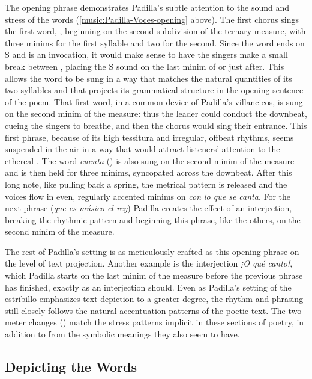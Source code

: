 The opening phrase demonstrates Padilla's subtle attention to the sound and
stress of the words (\cref{music:Padilla-Voces-opening} above).
The first chorus sings the first word, , beginning on the second
subdivision of the ternary measure, with three minims for the first syllable and
two for the second.
Since the word ends on S and is an invocation, it would make sense to have the
singers make a small break between , placing the S sound on the
last minim of  or just after.
This allows the word to be sung in a way that matches the natural quantities of
its two syllables and that projects its grammatical structure in the opening
sentence of the poem.
That first word, in a common device of Padilla's villancicos, is sung on the
second minim of the measure: thus the leader could conduct the downbeat, cueing
the singers to breathe, and then the chorus would sing their entrance. 
This first phrase, because of its high tessitura and irregular, offbeat rhythms,
seems suspended in the air in a way that would attract listeners' attention to
the ethereal . 
The word \emph{cuenta} () is also sung on the second minim of the
measure and is then held for three minims, syncopated across the downbeat.
After this long note, like pulling back a spring, the metrical pattern is
released and the voices flow in even, regularly accented minims on \emph{con lo
que se canta}.
For the next phrase (\emph{que es músico el rey}) Padilla creates the effect of
an interjection, breaking the rhythmic pattern and beginning this phrase, like
the others, on the second minim of the measure.

The rest of Padilla's setting is as meticulously crafted as this opening phrase
on the level of text projection.
Another example is the interjection \emph{¡O qué canto!}, which Padilla starts
on the last minim of the measure before the previous phrase has finished,
exactly as an interjection should.
Even as Padilla's setting of the estribillo emphasizes text depiction to a
greater degree, the rhythm and phrasing still closely follows the natural
accentuation patterns of the poetic text.
The two meter changes () match the stress patterns implicit
in these sections of poetry, in addition to from the symbolic meanings they also
seem to have.


\subsection{Depicting the Words}

